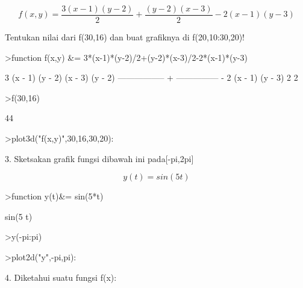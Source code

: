 \documentclass[a4paper,10pt]{article}
\begin{document}
\begin{eulernotebook}
\begin{eulercomment}
\begin{eulercomment}
\begin{eulercomment}
\end{eulercomment}
\begin{eulerformula}
\[
f(x,y)=\frac{3(x-1)(y-2)}{2}+\frac{(y-2)(x-3)}{2}-2(x-1)(y-3)
\]
\end{eulerformula}
\begin{eulercomment}
Tentukan nilai dari f(30,16) dan buat grafiknya di f(20,10:30,20)!
\end{eulercomment}
\begin{eulerprompt}
>function f(x,y) &= 3*(x-1)*(y-2)/2+(y-2)*(x-3)/2-2*(x-1)*(y-3)
\end{eulerprompt}
\begin{euleroutput}
  
         3 (x - 1) (y - 2)   (x - 3) (y - 2)
         ----------------- + --------------- - 2 (x - 1) (y - 3)
                 2                  2
  
\end{euleroutput}
\begin{eulerprompt}
>f(30,16)
\end{eulerprompt}
\begin{euleroutput}
  44
\end{euleroutput}
\begin{eulerprompt}
>plot3d("f(x,y)",30,16,30,20):
\end{eulerprompt}
\begin{eulercomment}
3. Sketsakan grafik fungsi dibawah ini pada[-pi,2pi]

\end{eulercomment}
\begin{eulerformula}
\[
y(t)=sin(5t)
\]
\end{eulerformula}
\begin{eulerprompt}
>function y(t)&= sin(5*t)
\end{eulerprompt}
\begin{euleroutput}
  
                                 sin(5 t)
  
\end{euleroutput}
\begin{eulerprompt}
>y(-pi:pi)
\end{eulerprompt}
\begin{euleroutput}
  [0,  0.958924,  0.544021,  -0.650288,  -0.912945,  0.132352,  0.988032]
\end{euleroutput}
\begin{eulerprompt}
>plot2d("y",-pi,pi):
\end{eulerprompt}
\begin{eulercomment}
4. Diketahui suatu fungsi f(x):


\end{eulercomment}
\end{eulercomment}
\end{eulercomment}
\end{eulernotebook}
\end{document}
